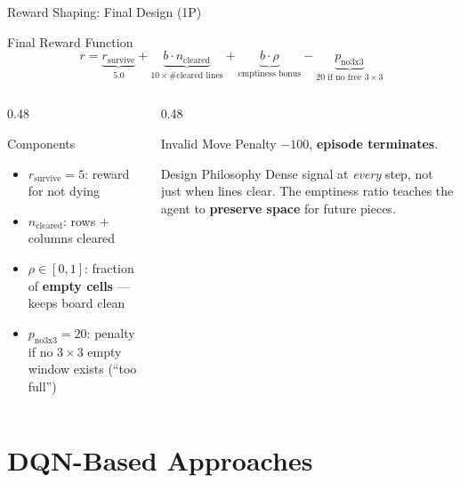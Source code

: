 \documentclass[aspectratio=169,10pt]{beamer}
\begin{document}
\begin{frame}{Reward Shaping: Final Design (1P)}
\begin{block}{Final Reward Function}
\[
r = \underbrace{r_{\text{survive}}}_{5.0}
  + \underbrace{b \cdot n_{\text{cleared}}}_{10 \times \#\text{cleared lines}}
  + \underbrace{b \cdot \rho}_{\text{emptiness bonus}}
  - \underbrace{p_{\text{no3x3}}}_{20 \text{ if no free }3\times3}
\]
\end{block}

\begin{columns}[T]
\begin{column}{0.48\textwidth}
\begin{exampleblock}{Components}
\begin{itemize}
    \item $r_{\text{survive}} = 5$: reward for not dying
    \item $n_{\text{cleared}}$: rows + columns cleared
    \item $\rho \in [0,1]$: fraction of \textbf{empty cells} — keeps board clean
    \item $p_{\text{no3x3}} = 20$: penalty if no $3\times3$ empty window exists (``too full'')
\end{itemize}
\end{exampleblock}
\end{column}

\begin{column}{0.48\textwidth}
\begin{alertblock}{Invalid Move}
Penalty $-100$, \textbf{episode terminates}.
\end{alertblock}

\vspace{0.5em}
\begin{block}{Design Philosophy}
Dense signal at \emph{every} step, not just when lines clear. The emptiness ratio teaches the agent to \textbf{preserve space} for future pieces.
\end{block}
\end{column}
\end{columns}
\end{frame}

\section{DQN-Based Approaches}
\end{document}
